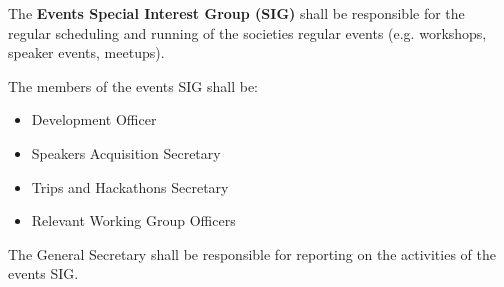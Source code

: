 \begin{clause}
    The \textbf{Events Special Interest Group (SIG)} shall be responsible for the regular scheduling and running of the societies regular events (e.g. workshops, speaker events, meetups).
\end{clause}

\begin{subclause}
    The members of the events SIG shall be:
    \begin{itemize}[label=--,topsep=0em,itemsep=0em]
        \item Development Officer
        \item Speakers Acquisition Secretary
        \item Trips and Hackathons Secretary
        \item Relevant Working Group Officers
    \end{itemize}
\end{subclause}

\begin{subclause}
    The General Secretary shall be responsible for reporting on the activities of the events SIG.
\end{subclause}